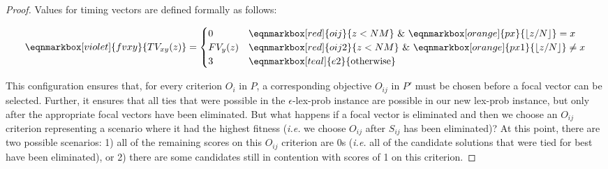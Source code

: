 \documentclass[sigconf]{acmart}
\begin{document}
\begin{proof}
Values for timing vectors are defined formally as follows:

\vspace{2em}

\begin{equation}
\eqnmarkbox[violet]{fvxy}{TV_{xy}(z)} = \begin{cases} 
                0 & \eqnmarkbox[red]{oij}{z < NM} \text{ }  \& \text{ }  \eqnmarkbox[orange]{px}{\lfloor z/N \rfloor} = x \\
                FV_y(z) & \eqnmarkbox[red]{oij2}{z < NM} \text{ }  \& \text{ }  \eqnmarkbox[orange]{px1}{\lfloor z/N \rfloor} \neq x \\
                3 & \eqnmarkbox[teal]{e2}{\text{otherwise}}
            \end{cases}
\end{equation}

\vspace{4em}

This configuration ensures that, for every criterion $O_i$ in $P$, a corresponding objective $O_{ij}$ in $P'$ must be chosen before a focal vector can be selected. Further, it ensures that all ties that were possible in the {\sc $\epsilon$-lex-prob} instance are possible in our new {\sc lex-prob} instance, but only after the appropriate focal vectors have been eliminated. But what happens if a focal vector is eliminated and then we choose an $O_{ij}$ criterion representing a scenario where it had the highest fitness (\textit{i.e.} we choose $O_{ij}$ after $S_{ij}$ has been eliminated)? At this point, there are two possible scenarios: 1) all of the remaining scores on this $O_{ij}$ criterion are 0s (\textit{i.e.} all of the candidate solutions that were tied for best have been eliminated), or 2) there are some candidates still in contention with scores of 1 on this criterion. 


\end{proof}
\end{document}
